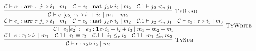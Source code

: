 \documentclass[fleqn]{article}
\begin{document}
\[\begin{array}{l}
	\infer[\textsc{TyRead}]{\mathcal{C} \vdash e_1[e_2] : \tau \triangleright i_1 + i_2 \mid m_1 + m_2}{\mathcal{C} \vdash e_1 : \mathbf{arr}~\tau~j_1 \triangleright i_1 \mid m_1 & \mathcal{C} \vdash e_2 : \mathbf{nat}~j_2 \triangleright i_2 \mid m_2 & \mathcal{C}.1 \vdash j_2 <_n j_1} \\
	\infer[\textsc{TyWrite}]{\mathcal{C} \vdash e_1[e_2] := e_3 : \mathbf{1} \triangleright i_1 + i_2 + i_3 \mid m_1 + m_2 + m_3}{\mathcal{C} \vdash e_1 : \mathbf{arr}~\tau~j_1 \triangleright i_1 \mid m_1 & \mathcal{C} \vdash e_2 : \mathbf{nat}~j_2 \triangleright i_2 \mid m_2 & \mathcal{C}.1 \vdash j_2 <_n j_1 & \mathcal{C} \vdash e_3 : \tau \triangleright i_3 \mid m_3} \\
	\infer[\textsc{TySub}]{\mathcal{C} \vdash e : \tau_2 \triangleright i_2 \mid m_2}{\mathcal{C} \vdash e : \tau_1 \triangleright i_1 \mid m_1 & \mathcal{C}.1 \vdash \tau_1 \equiv \tau_2 & \mathcal{C}.1 \vdash i_1 \le_r i_2 & \mathcal{C}.1 \vdash m_1 \le_n m_2}
\end{array}
\]
\end{document}
